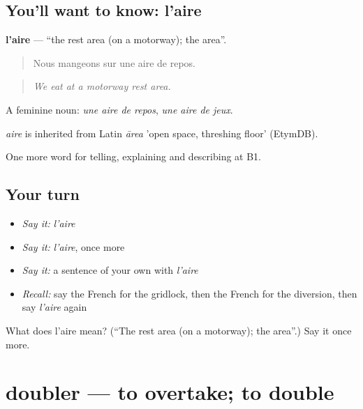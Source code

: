 \subsection*{You'll want to know: l'aire}
\textbf{l'aire} — \textquotedblleft{}the rest area (on a motorway); the area\textquotedblright{}.

\begin{quote}
Nous mangeons sur une aire de repos.
\end{quote}

\begin{quote}
\emph{We eat at a motorway rest area.}
\end{quote}

A feminine noun: \emph{une aire de repos}, \emph{une aire de jeux}.

\begin{cousinweb}
\emph{aire} is inherited from Latin \emph{ārea} 'open space, threshing floor' (EtymDB).
\end{cousinweb}

\begin{grammarlens}[title={What you've built}]
One more word for telling, explaining and describing at B1.
\end{grammarlens}

\subsection*{Your turn}
\begin{itemize}
\raggedright
  \item \emph{Say it:} \emph{l'aire}
  \item \emph{Say it:} \emph{l'aire}, once more
  \item \emph{Say it:} a sentence of your own with \emph{l'aire}
  \item \emph{Recall:} say the French for the gridlock, then the French for the diversion, then say \emph{l'aire} again
\end{itemize}

\begin{tcolorbox}[breakable,colback=teal!4,colframe=teal!35!black,title={Before you move on}]
What does l'aire mean? (\textquotedblleft{}The rest area (on a motorway); the area\textquotedblright{}.) Say it once more.
\end{tcolorbox}
\section[doubler]{doubler — to overtake; to double}

